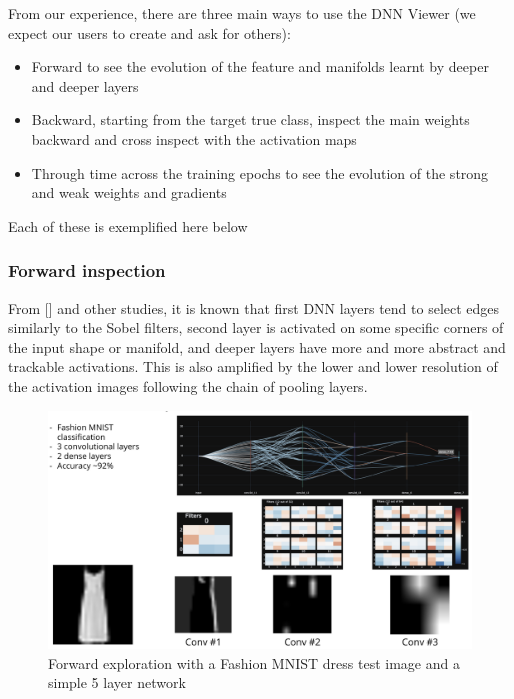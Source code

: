 From our experience, there are three main ways to use the DNN Viewer (we expect our users to create and ask for others):
\begin{itemize}
    \item Forward to see the evolution of the feature and manifolds learnt by deeper and deeper layers
    \item Backward, starting from the target true class, inspect the main weights backward and cross inspect with the activation maps
    \item Through time across the training epochs to see the evolution of the strong and weak weights and gradients
\end{itemize}

Each of these is exemplified here below

\subsubsection{Forward inspection}

From [\cite{Erhan2009}] and other studies, it is known that first DNN layers tend to select edges similarly to the Sobel filters, second layer is activated on some specific corners of the input shape or manifold, and deeper layers have more and more abstract and trackable activations. This is also amplified by the lower and lower resolution of the activation images following the chain of pooling layers.

\begin{figure}[H]
    \centering
    \includegraphics[scale=0.4]{images/dnn-viewer/ForwardDress.png}
    \caption{Forward exploration with a Fashion MNIST dress test image and a simple 5 layer network}
    \label{fig:dnn-viewer-forward-dress}
\end{figure}

